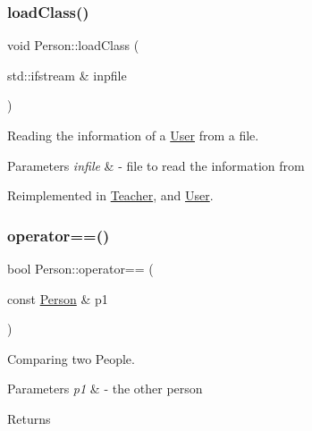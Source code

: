 \subsubsection{\texorpdfstring{load\+Class()}{loadClass()}}
{\footnotesize\ttfamily void Person\+::load\+Class (\begin{DoxyParamCaption}\item[{std\+::ifstream \&}]{inpfile }\end{DoxyParamCaption})\hspace{0.3cm}{\ttfamily [virtual]}}



Reading the information of a \mbox{\hyperlink{class_user}{User}} from a file. 


\begin{DoxyParams}{Parameters}
{\em infile} & -\/ file to read the information from \\
\hline
\end{DoxyParams}


Reimplemented in \mbox{\hyperlink{class_teacher_a1f204644af41c43ff3bd0582393062fa}{Teacher}}, and \mbox{\hyperlink{class_user_abc12a9ca668bd860a3d6d2ae4791997d}{User}}.

\mbox{\label{class_person_aa2fe338cbcf08ee5981dce811fd3a50a}} 
\subsubsection{\texorpdfstring{operator==()}{operator==()}}
{\footnotesize\ttfamily bool Person\+::operator== (\begin{DoxyParamCaption}\item[{const \mbox{\hyperlink{class_person}{Person}} \&}]{p1 }\end{DoxyParamCaption})}



Comparing two People. 


\begin{DoxyParams}{Parameters}
{\em p1} & -\/ the other person \\
\hline
\end{DoxyParams}
\begin{DoxyReturn}{Returns}

\end{DoxyReturn}
\mbox{\label{class_person_a80f87df3f644706c2ad8fc8b800fdd95}} 
